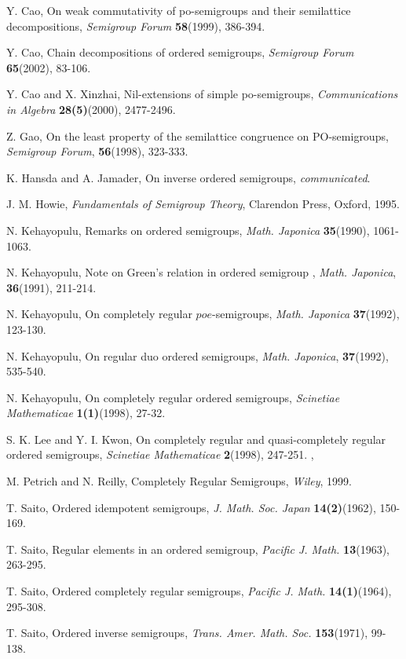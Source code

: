 \documentclass[13pt]{article}
\theoremstyle{definition}
\theoremstyle{remark}
\numberwithin{equation}{section}
\begin{document}

\begin{thebibliography}{10}
\baselineskip 5mm

Y. Cao, On weak commutativity of po-semigroups and their semilattice decompositions, \emph{Semigroup Forum} \textbf{58}(1999), 386-394.

Y. Cao, Chain decompositions of ordered semigroups, \emph{Semigroup Forum} \textbf{65}(2002), 83-106.

Y. Cao and X. Xinzhai, {Nil-extensions of simple po-semigroups}, \emph{Communications in Algebra} \textbf{28(5)}(2000), 2477-2496.

Z. Gao, On the least property of the semilattice congruence on
PO-semigroups, \emph{Semigroup Forum}, \textbf{56}(1998), 323-333.

K. Hansda and A. Jamader, On inverse ordered semigroups,
\emph{communicated}.

J. M. Howie, \emph{Fundamentals of Semigroup Theory}, Clarendon Press, Oxford,  1995.

N. Kehayopulu, Remarks on  ordered semigroups, \emph{Math. Japonica}
\textbf{35}(1990), 1061-1063.

N. Kehayopulu,   Note on Green's relation in ordered semigroup ,
\emph{Math. Japonica}, \textbf{36}(1991), 211-214.

N. Kehayopulu, On completely regular $poe$-semigroups, \emph{Math. Japonica} \textbf{37}(1992), 123-130.

N. Kehayopulu, {On  regular  duo ordered semigroups}, \emph{Math.
Japonica}, \textbf{37}(1992), 535-540.



N. Kehayopulu, On completely regular ordered semigroups,
\emph{Scinetiae Mathematicae} \textbf{1(1)}(1998), 27-32.

S. K. Lee and Y. I. Kwon, On completely regular and quasi-completely
regular ordered semigroups, \emph{Scinetiae Mathematicae}
\textbf{2}(1998), 247-251.
 ,


M. Petrich and N. Reilly,  {Completely Regular Semigroups},
\emph{Wiley}, 1999.

T. Saito, Ordered idempotent semigroups, \emph{J. Math. Soc. Japan} \textbf{14(2)}(1962), 150-169.

T. Saito, Regular elements in an ordered semigroup, \emph{Pacific J. Math.} \textbf{13}(1963), 263-295.

T. Saito, Ordered completely regular semigroups, \emph{Pacific J. Math.} \textbf{14(1)}(1964), 295-308.

T. Saito, {Ordered inverse semigroups}, \emph{Trans. Amer. Math. Soc.} \textbf{153}(1971), 99-138.
\end{thebibliography}
\end{document}
